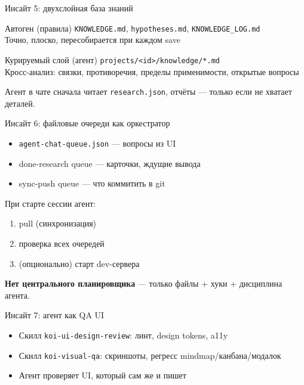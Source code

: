 \documentclass[aspectratio=169,11pt]{beamer}
\begin{document}
\begin{frame}{Инсайт 5: двухслойная база знаний}
  \begin{block}{Автоген (правила)}
    \texttt{KNOWLEDGE.md}, \texttt{hypotheses.md}, \texttt{KNOWLEDGE\_LOG.md}\\
    Точно, плоско, пересобирается при каждом save
  \end{block}
  \begin{block}{Курируемый слой (агент)}
    \texttt{projects/<id>/knowledge/*.md}\\
    Кросс-анализ: связки, противоречия, пределы применимости, открытые вопросы
  \end{block}
  \small Агент в чате сначала читает \texttt{research.json}, отчёты --- только если не хватает деталей.
\end{frame}

\begin{frame}{Инсайт 6: файловые очереди как оркестратор}
  \begin{itemize}
    \item \texttt{agent-chat-queue.json} --- вопросы из UI
    \item done-research queue --- карточки, ждущие вывода
    \item sync-push queue --- что коммитить в git
  \end{itemize}
  \vspace{0.5em}
  При старте сессии агент:
  \begin{enumerate}
    \item pull (синхронизация)
    \item проверка всех очередей
    \item (опционально) старт dev-сервера
  \end{enumerate}
  \vspace{0.5em}
  \textbf{Нет центрального планировщика} --- только файлы + хуки + дисциплина агента.
\end{frame}

\begin{frame}{Инсайт 7: агент как QA UI}
  \begin{itemize}
    \item Скилл \texttt{koi-ui-design-review}: линт, design tokens, a11y
    \item Скилл \texttt{koi-visual-qa}: скриншоты, регресс mindmap/канбана/модалок
    \item Агент проверяет UI, который сам же и пишет
  \end{itemize}
\end{frame}
\end{document}
